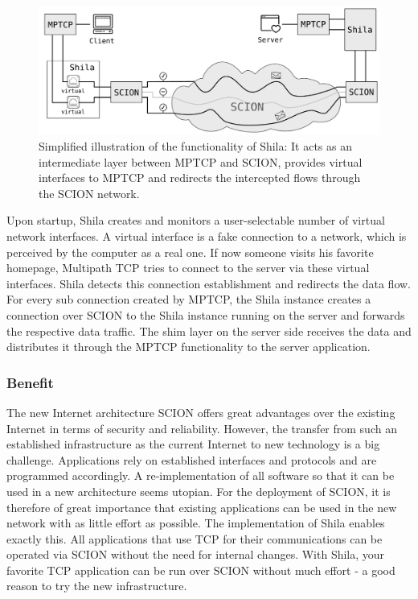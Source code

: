 \begin{figure}[H]
	\begin{center}
		\def\svgwidth{1\textwidth}
		\includegraphics[scale=0.28]{../illustrations/introduction/Shila.pdf} 
		\caption[Caption for the list of figures.]{Simplified illustration of the functionality of Shila: It acts as an intermediate layer between MPTCP and SCION, provides virtual interfaces to MPTCP and redirects the intercepted flows through the SCION network.}
		\label{fig:IntroRoleOfShila}
	\end{center}
\end{figure}

Upon startup, Shila creates and monitors a user-selectable number of virtual network interfaces. A virtual interface is a fake connection to a network, which is perceived by the computer as a real one. If now someone visits his favorite homepage, Multipath TCP tries to connect to the server via these virtual interfaces. Shila detects this connection establishment and redirects the data flow.  For every sub connection created by MPTCP, the Shila instance creates a connection over SCION to the Shila instance running on the server and forwards the respective data traffic. The shim layer on the server side receives the data and distributes it through the MPTCP functionality to the server application.

\subsubsection{Benefit}

The new Internet architecture SCION offers great advantages over the existing Internet in terms of security and reliability. However, the transfer from such an established infrastructure as the current Internet to new technology is a big challenge. Applications rely on established interfaces and protocols and are programmed accordingly. A re-implementation of all software so that it can be used in a new architecture seems utopian. For the deployment of SCION, it is therefore of great importance that existing applications can be used in the new network with as little effort as possible. The implementation of Shila enables exactly this. All applications that use TCP for their communications can be operated via SCION without the need for internal changes. With Shila, your favorite TCP application can be run over SCION without much effort - a good reason to try the new infrastructure.

